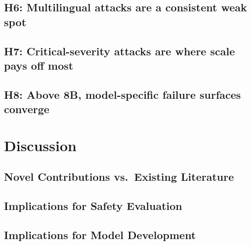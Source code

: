 \documentclass[conference]{IEEEtran}
\begin{document}
\subsection{H6: Multilingual attacks are a consistent weak spot}


\subsection{H7: Critical-severity attacks are where scale pays off most}


\subsection{H8: Above 8B, model-specific failure surfaces converge}


\section{Discussion}
\label{sec:discussion}

\subsection{Novel Contributions vs.\ Existing Literature}

\subsection{Implications for Safety Evaluation}

\subsection{Implications for Model Development}
\end{document}
